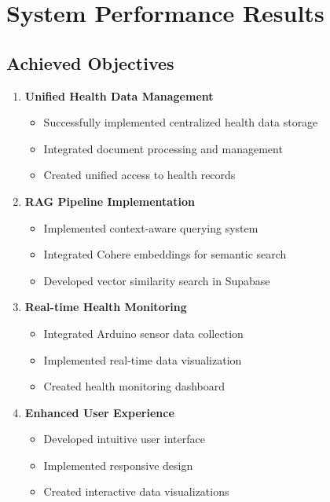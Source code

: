 \section{System Performance Results}
\subsection{Achieved Objectives}
\begin{enumerate}
    \item \textbf{Unified Health Data Management}
    \begin{itemize}
        \item Successfully implemented centralized health data storage
        \item Integrated document processing and management
        \item Created unified access to health records
    \end{itemize}

    \item \textbf{RAG Pipeline Implementation}
    \begin{itemize}
        \item Implemented context-aware querying system
        \item Integrated Cohere embeddings for semantic search
        \item Developed vector similarity search in Supabase
    \end{itemize}

    \item \textbf{Real-time Health Monitoring}
    \begin{itemize}
        \item Integrated Arduino sensor data collection
        \item Implemented real-time data visualization
        \item Created health monitoring dashboard
    \end{itemize}

    \item \textbf{Enhanced User Experience}
    \begin{itemize}
        \item Developed intuitive user interface
        \item Implemented responsive design
        \item Created interactive data visualizations
    \end{itemize}
\end{enumerate}

